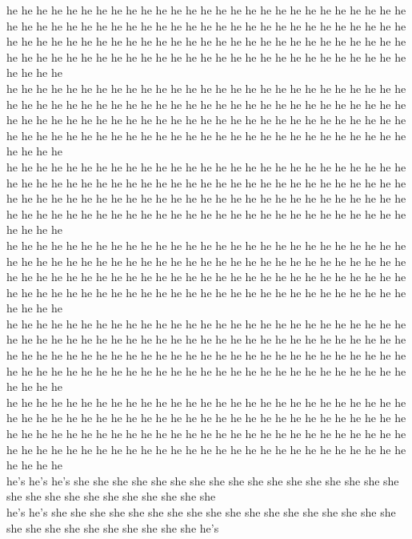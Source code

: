 he he he he he he he he he he he he he he he he he he he he he he he he he he he he he he he he he he he he he he he he he he he he he he he he he he he he he he he he he he he he he he he he he he he he he he he he he he he he he he he he he he he he he he he he he he he he he he he he he he he he he he he he he he he he he he he he\\
he he he he he he he he he he he he he he he he he he he he he he he he he he he he he he he he he he he he he he he he he he he he he he he he he he he he he he he he he he he he he he he he he he he he he he he he he he he he he he he he he he he he he he he he he he he he he he he he he he he he he he he he he he he he he he he he\\
he he he he he he he he he he he he he he he he he he he he he he he he he he he he he he he he he he he he he he he he he he he he he he he he he he he he he he he he he he he he he he he he he he he he he he he he he he he he he he he he he he he he he he he he he he he he he he he he he he he he he he he he he he he he he he he he\\
he he he he he he he he he he he he he he he he he he he he he he he he he he he he he he he he he he he he he he he he he he he he he he he he he he he he he he he he he he he he he he he he he he he he he he he he he he he he he he he he he he he he he he he he he he he he he he he he he he he he he he he he he he he he he he he he\\
he he he he he he he he he he he he he he he he he he he he he he he he he he he he he he he he he he he he he he he he he he he he he he he he he he he he he he he he he he he he he he he he he he he he he he he he he he he he he he he he he he he he he he he he he he he he he he he he he he he he he he he he he he he he he he he he\\
he he he he he he he he he he he he he he he he he he he he he he he he he he he he he he he he he he he he he he he he he he he he he he he he he he he he he he he he he he he he he he he he he he he he he he he he he he he he he he he he he he he he he he he he he he he he he he he he he he he he he he he he he he he he he he he he\\
he's he's he's she she she she she she she she she she she she she she she she she she she she she she she she she she she she\\
he's he's she she she she she she she she she she she she she she she she she she she she she she she she she she she she he's\\
